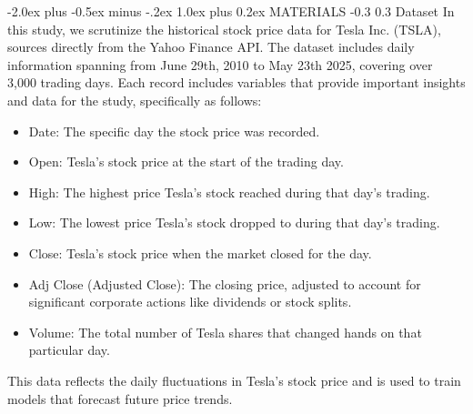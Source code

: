 \documentclass[twocolumn]{llncs}
\makeatletter
\renewcommand{\section}{\@startsection{section}{1}{\z@}%
  {-2.0ex plus -0.5ex minus -.2ex}%
  {1.0ex plus 0.2ex}%
  {\centering\normalfont\normalsize\bfseries}}
\renewcommand{\subsection}{\@startsection{subsection}{2}{\z@}%
  {-0.3\baselineskip}  %
  {0.3\baselineskip}   %
  {\normalfont\normalsize\bfseries}}
\makeatother
\begin{document}
\section{MATERIALS}
\subsection{Dataset}
In this study, we scrutinize the historical stock price data for Tesla Inc. (TSLA), sources directly from the Yahoo Finance API. The dataset includes daily information spanning from June 29th, 2010 to May 23th 2025, covering over 3,000 trading days. Each record includes variables that provide important insights and data for the study, specifically as follows:
\renewcommand{\labelitemi}{\textbullet} 
\begin{itemize}[itemsep=1em]
    \item Date: The specific day the stock price was recorded.
    \item Open: Tesla's stock price at the start of the trading day.
    \item High: The highest price Tesla's stock reached during that day's trading.
    \item Low: The lowest price Tesla's stock dropped to during that day's trading.
    \item Close: Tesla's stock price when the market closed for the day.
    \item Adj Close (Adjusted Close): The closing price, adjusted to account for significant corporate actions like dividends or stock splits.
    \item Volume: The total number of Tesla shares that changed hands on that particular day.
\end{itemize}
This data reflects the daily fluctuations in Tesla's stock price and is used to train models that forecast future price trends.
%
\end{document}
